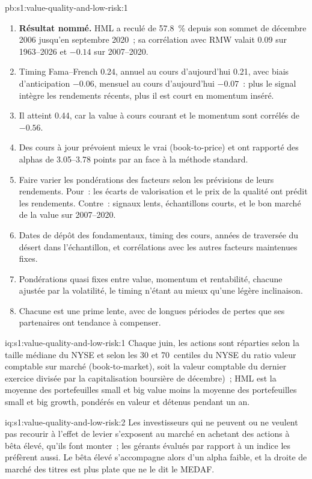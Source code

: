 \begin{solution}{pb:s1:value-quality-and-low-risk:1}
\begin{enumerate}
\item \textbf{Résultat nommé.} HML a reculé de 57.8~\% depuis son sommet de décembre 2006 jusqu'en septembre 2020~; sa corrélation avec RMW valait 0.09 sur 1963--2026 et $-0.14$ sur
2007--2020.
\item Timing Fama--French 0.24, annuel au cours d'aujourd'hui 0.21, avec biais d'anticipation $-0.06$, mensuel au cours d'aujourd'hui $-0.07$~: plus le signal intègre
les rendements récents, plus il est court en momentum inséré.
\item Il atteint 0.44, car la value à cours courant et le momentum sont corrélés de $-0.56$.
\item Des cours à jour prévoient mieux le vrai  (book-to-price) et ont rapporté des alphas de 3.05--3.78 points par an face à la méthode standard.
\item Faire varier les pondérations des facteurs selon les prévisions de leurs rendements. Pour~: les écarts de valorisation et le prix de la qualité ont prédit les rendements. Contre~: signaux lents,
échantillons courts, et le bon marché de la value sur 2007--2020.
\item Dates de dépôt des fondamentaux, timing des cours, années de traversée du désert dans l'échantillon, et corrélations avec les autres facteurs maintenues fixes.
\item Pondérations quasi fixes entre value, momentum et rentabilité, chacune ajustée par la volatilité, le timing n'étant au mieux qu'une légère inclinaison.
\item Chacune est une prime lente, avec de longues périodes de pertes que ses partenaires ont tendance à compenser.
\end{enumerate}
\end{solution}

\begin{solution}{iq:s1:value-quality-and-low-risk:1}
Chaque juin, les actions sont réparties selon la taille médiane du NYSE et selon les 30 et 70~centiles du NYSE du ratio valeur comptable sur marché (book-to-market), soit la valeur comptable du dernier exercice divisée par la
capitalisation boursière de décembre)~; HML est la moyenne des portefeuilles small et big value moins la moyenne des portefeuilles small et big growth, pondérés en valeur et détenus pendant un
an.
\end{solution}

\begin{solution}{iq:s1:value-quality-and-low-risk:2}
Les investisseurs qui ne peuvent ou ne veulent pas recourir à l'effet de levier s'exposent au marché en achetant des actions à bêta élevé, qu'ils font monter~; les gérants évalués par rapport à un indice les préfèrent aussi. Le bêta élevé
s'accompagne alors d'un alpha faible, et la droite de marché des titres est plus plate que ne le dit le MEDAF.
\end{solution}

